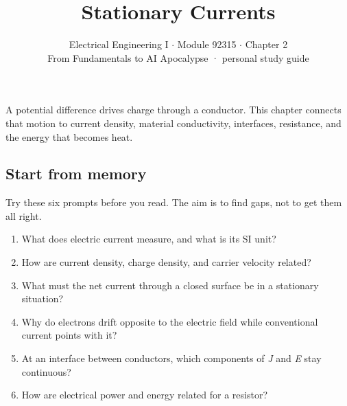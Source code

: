 \documentclass[11pt]{article}
\title{\sffamily\bfseries\color{FAUblue}Stationary Currents}
\author{Electrical Engineering I \ensuremath{\cdot} Module 92315 \ensuremath{\cdot} Chapter 2\\[2pt]\small From Fundamentals to AI Apocalypse · personal study guide}
\date{}
\begin{document}
\maketitle
\begingroup\footnotesize\setlength{\parskip}{0pt}\tableofcontents\endgroup
\clearpage

{\large A potential difference drives charge through a conductor. This chapter connects that motion to current density, material conductivity, interfaces, resistance, and the energy that becomes heat.}


\begin{keepsection}
\section{Start from memory}

Try these six prompts before you read. The aim is to find gaps, not to get them all right.

\begin{enumerate}
\item What does electric current measure, and what is its SI unit?
\item How are current density, charge density, and carrier velocity related?
\item What must the net current through a closed surface be in a stationary situation?
\item Why do electrons drift opposite to the electric field while conventional current points with it?
\item At an interface between conductors, which components of \textit{J} and \textit{E} stay continuous?
\item How are electrical power and energy related for a resistor?
\end{enumerate}

\end{keepsection}
\end{document}
